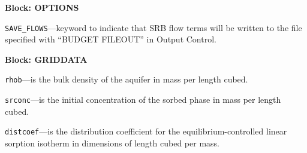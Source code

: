 
\item \textbf{Block: OPTIONS}

\begin{description}
\item \texttt{SAVE\_FLOWS}---keyword to indicate that SRB flow terms will be written to the file specified with ``BUDGET FILEOUT'' in Output Control.

\end{description}
\item \textbf{Block: GRIDDATA}

\begin{description}
\item \texttt{rhob}---is the bulk density of the aquifer in mass per length cubed.

\item \texttt{srconc}---is the initial concentration of the sorbed phase in mass per length cubed.

\item \texttt{distcoef}---is the distribution coefficient for the equilibrium-controlled linear sorption isotherm in dimensions of length cubed per mass.

\end{description}

